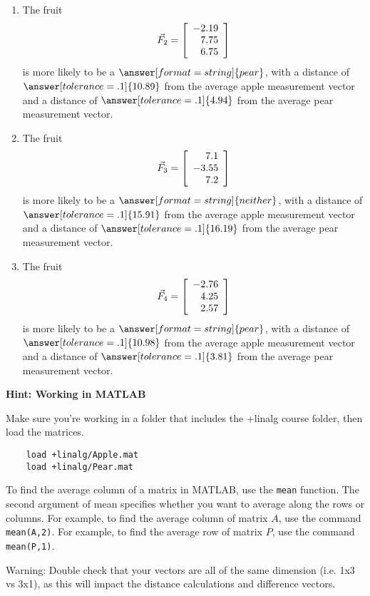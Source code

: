\documentclass{ximera}
\begin{document}
\begin{problem}
\begin{enumerate}
\item
The fruit
\begin{equation*}
  \vec{F}_2=\startmat{r}
    -2.19 \\
    7.75 \\
    6.75
  \stopmat
\end{equation*}
is more likely to be a $\answer[format=string]{pear}$, with a distance of $\answer[tolerance=.1]{10.89}$ from the average apple measurement vector and a distance of $\answer[tolerance=.1]{4.94}$ from the average pear measurement vector.

\item
The fruit
\begin{equation*}
  \vec{F}_3=\startmat{r}
    7.1 \\
    -3.55 \\
    7.2
  \stopmat
\end{equation*}
is more likely to be a $\answer[format=string]{neither}$, with a distance of $\answer[tolerance=.1]{15.91}$ from the average apple measurement vector and a distance of $\answer[tolerance=.1]{16.19}$ from the average pear measurement vector.

\item
The fruit
\begin{equation*}
  \vec{F}_4=\startmat{r}
    -2.76 \\
    4.25 \\
    2.57
  \stopmat
\end{equation*}
is more likely to be a $\answer[format=string]{pear}$, with a distance of $\answer[tolerance=.1]{10.98}$ from the average apple measurement vector and a distance of $\answer[tolerance=.1]{3.81}$ from the average pear measurement vector.

\end{enumerate}

{\bf Hint: Working in MATLAB}

  Make sure you're working in a folder that includes the +linalg course folder, then load the matrices.

  \begin{verbatim}
    load +linalg/Apple.mat
    load +linalg/Pear.mat
  \end{verbatim}

  To find the average column of a matrix in MATLAB, use the \texttt{mean} function. The second argument of mean specifies whether you want to average along the rows or columns. For example, to find the average column of matrix $A$, use the command \texttt{mean(A,2)}. For example, to find the average row of matrix $P$, use the command \texttt{mean(P,1)}.

  Warning: Double check that your vectors are all of the same dimension (i.e. 1x3 vs 3x1), as this will impact the distance calculations and difference vectors.



  
\end{problem}
\end{document}
